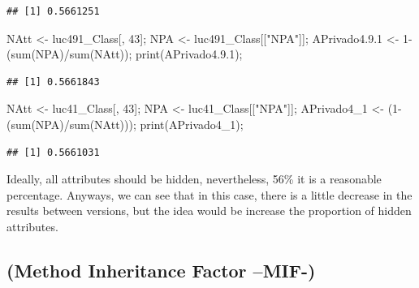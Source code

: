 \documentclass[
]{article}
\newenvironment{Shaded}{\begin{snugshade}}{\end{snugshade}}
\newcommand{\DecValTok}[1]{\textcolor[rgb]{0.00,0.00,0.81}{#1}}
\newcommand{\FloatTok}[1]{\textcolor[rgb]{0.00,0.00,0.81}{#1}}
\newcommand{\FunctionTok}[1]{\textcolor[rgb]{0.00,0.00,0.00}{#1}}
\newcommand{\NormalTok}[1]{#1}
\newcommand{\OtherTok}[1]{\textcolor[rgb]{0.56,0.35,0.01}{#1}}
\newcommand{\SpecialCharTok}[1]{\textcolor[rgb]{0.00,0.00,0.00}{#1}}
\newcommand{\StringTok}[1]{\textcolor[rgb]{0.31,0.60,0.02}{#1}}
\begin{document}
\begin{verbatim}
## [1] 0.5661251
\end{verbatim}

\begin{Shaded}
\begin{Highlighting}[]
\NormalTok{NAtt }\OtherTok{\textless{}{-}}\NormalTok{ luc491\_Class[, }\DecValTok{43}\NormalTok{];}
\NormalTok{NPA }\OtherTok{\textless{}{-}}\NormalTok{ luc491\_Class[[}\StringTok{"NPA"}\NormalTok{]];}
\NormalTok{APrivado4.}\FloatTok{9.1} \OtherTok{\textless{}{-}} \DecValTok{1}\SpecialCharTok{{-}}\NormalTok{(}\FunctionTok{sum}\NormalTok{(NPA)}\SpecialCharTok{/}\FunctionTok{sum}\NormalTok{(NAtt));}
\FunctionTok{print}\NormalTok{(APrivado4.}\FloatTok{9.1}\NormalTok{);}
\end{Highlighting}
\end{Shaded}

\begin{verbatim}
## [1] 0.5661843
\end{verbatim}

\begin{Shaded}
\begin{Highlighting}[]
\NormalTok{NAtt }\OtherTok{\textless{}{-}}\NormalTok{ luc41\_Class[, }\DecValTok{43}\NormalTok{];}
\NormalTok{NPA }\OtherTok{\textless{}{-}}\NormalTok{ luc41\_Class[[}\StringTok{"NPA"}\NormalTok{]];}
\NormalTok{APrivado4\_1 }\OtherTok{\textless{}{-}}\NormalTok{ (}\DecValTok{1}\SpecialCharTok{{-}}\NormalTok{(}\FunctionTok{sum}\NormalTok{(NPA)}\SpecialCharTok{/}\FunctionTok{sum}\NormalTok{(NAtt)));}
\FunctionTok{print}\NormalTok{(APrivado4\_1);}
\end{Highlighting}
\end{Shaded}

\begin{verbatim}
## [1] 0.5661031
\end{verbatim}

Ideally, all attributes should be hidden, nevertheless, 56\% it is a
reasonable percentage. Anyways, we can see that in this case, there is a
little decrease in the results between versions, but the idea would be
increase the proportion of hidden attributes.

\hypertarget{method-inheritance-factor-mif-}{%
\subsection{(Method Inheritance Factor
--MIF-)}\label{method-inheritance-factor-mif-}}
\end{document}
